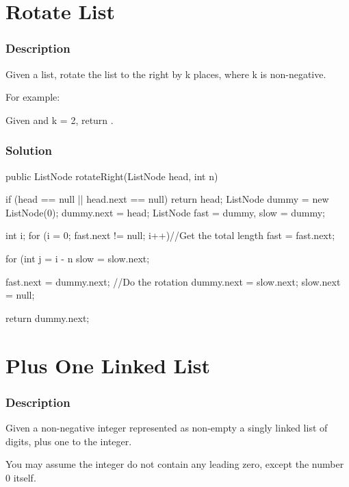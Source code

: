 \newpage

\section{Rotate List} %

\subsubsection{Description}
Given a list, rotate the list to the right by k places, where k is non-negative.

For example:

Given  and k = 2,
return .

\subsubsection{Solution}

\begin{Code}
public ListNode rotateRight(ListNode head, int n) {
    if (head == null || head.next == null) return head;
    ListNode dummy = new ListNode(0);
    dummy.next = head;
    ListNode fast = dummy, slow = dummy;

    int i;
    for (i = 0; fast.next != null; i++)//Get the total length
        fast = fast.next;

    for (int j = i - n %
        slow = slow.next;

    fast.next = dummy.next; //Do the rotation
    dummy.next = slow.next;
    slow.next = null;

    return dummy.next;
}
\end{Code}

\newpage

\section{Plus One Linked List} %

\subsubsection{Description}
Given a non-negative integer represented as non-empty a singly linked list of digits, plus one to the integer.

You may assume the integer do not contain any leading zero, except the number 0 itself.

